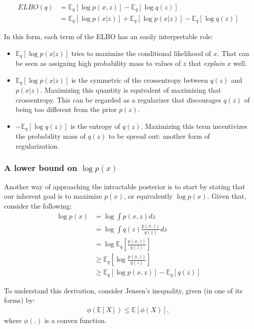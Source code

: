 \begin{align}
    ELBO(q) &= \mathbb{E}_q [\log p(x, z)] - \mathbb{E}_q [\log q(z)] \\
            &= \mathbb{E}_q [\log p(x|z)] + \mathbb{E}_q [\log p(x|z)] - \mathbb{E}_q [\log q(z)]
\end{align}

In this form, each term of the ELBO has an easily interpretable role:
\begin{itemize}
    \item $\mathbb{E}_q [\log p(x|z)]$ tries to maximize the conditional likelihood of $x$. That
        can be seen as assigning high probability mass to values of $z$ that \emph{explain} $x$
        well.
    \item $\mathbb{E}_q [\log p(x|z)]$ is the symmetric of the crossentropy between
        $q(z)$ and $p(x|z)$. Maximizing this quantity is equivalent of maximizing
        that crossentropy. This can be regarded as a regularizer that discourages
        $q(z)$ of being too different from the prior $p(z)$.
    \item $ - \mathbb{E}_q [\log q(z)]$ is the entropy of $q(z)$. Maximizing
        this term incentivizes the probability mass of $q(z)$ to be spread out:
        another form of regularization.
\end{itemize}

\subsubsection{A lower bound on $\log p(x)$}
\label{subsubsection:elbo}

Another way of approaching the intractable posterior is to start by stating
that our inherent goal is to maximize $p(x)$, or equivalently $\log p(x)$. Given
that, consider the following:
\begin{align}
    \log p(x) &= \log \int p(x, z) dz\\
    &= \log \int q(z) \frac{p(x, z)}{q(z)} dz \\
    &= \log \mathbb{E}_q[\frac{p(x, z)}{q(z)}] \label{eq:elbojensen1} \\
    &\geq \mathbb{E}_q[\log \frac{p(x, z)}{q(z)}] \label{eq:elbojensen2} \\
    &\geq \mathbb{E}_q[\log p(x, z)] - \mathbb{E}_q[q(z)] \label{eq:elbojensen3}
\end{align}

To understand this derivation, consider Jensen's inequality, given (in one of
its forms) by:
\begin{align}
    \phi(\mathbb{E}[X]) \leq \mathbb{E}[\phi(X)], \label{eq:jensen}
\end{align} where $\phi(.)$ is a convex function.

